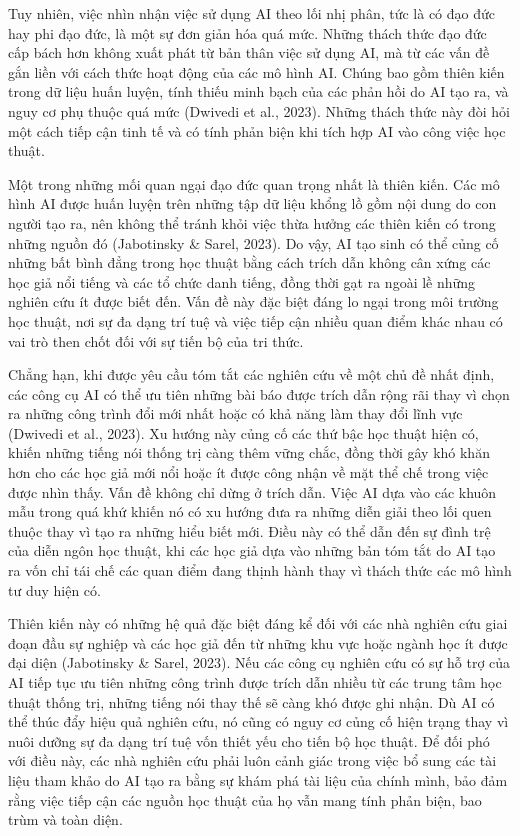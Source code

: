 Tuy nhiên, việc nhìn nhận việc sử dụng AI theo lối nhị phân, tức là có đạo đức hay phi đạo đức, là một sự đơn giản hóa quá mức. Những thách thức đạo đức cấp bách hơn không xuất phát từ bản thân việc sử dụng AI, mà từ các vấn đề gắn liền với cách thức hoạt động của các mô hình AI. Chúng bao gồm thiên kiến trong dữ liệu huấn luyện, tính thiếu minh bạch của các phản hồi do AI tạo ra, và nguy cơ phụ thuộc quá mức (Dwivedi et al., 2023). Những thách thức này đòi hỏi một cách tiếp cận tinh tế và có tính phản biện khi tích hợp AI vào công việc học thuật.

Một trong những mối quan ngại đạo đức quan trọng nhất là thiên kiến. Các mô hình AI được huấn luyện trên những tập dữ liệu khổng lồ gồm nội dung do con người tạo ra, nên không thể tránh khỏi việc thừa hưởng các thiên kiến có trong những nguồn đó (Jabotinsky \& Sarel, 2023). Do vậy, AI tạo sinh có thể củng cố những bất bình đẳng trong học thuật bằng cách trích dẫn không cân xứng các học giả nổi tiếng và các tổ chức danh tiếng, đồng thời gạt ra ngoài lề những nghiên cứu ít được biết đến. Vấn đề này đặc biệt đáng lo ngại trong môi trường học thuật, nơi sự đa dạng trí tuệ và việc tiếp cận nhiều quan điểm khác nhau có vai trò then chốt đối với sự tiến bộ của tri thức.

Chẳng hạn, khi được yêu cầu tóm tắt các nghiên cứu về một chủ đề nhất định, các công cụ AI có thể ưu tiên những bài báo được trích dẫn rộng rãi thay vì chọn ra những công trình đổi mới nhất hoặc có khả năng làm thay đổi lĩnh vực (Dwivedi et al., 2023). Xu hướng này củng cố các thứ bậc học thuật hiện có, khiến những tiếng nói thống trị càng thêm vững chắc, đồng thời gây khó khăn hơn cho các học giả mới nổi hoặc ít được công nhận về mặt thể chế trong việc được nhìn thấy. Vấn đề không chỉ dừng ở trích dẫn. Việc AI dựa vào các khuôn mẫu trong quá khứ khiến nó có xu hướng đưa ra những diễn giải theo lối quen thuộc thay vì tạo ra những hiểu biết mới. Điều này có thể dẫn đến sự đình trệ của diễn ngôn học thuật, khi các học giả dựa vào những bản tóm tắt do AI tạo ra vốn chỉ tái chế các quan điểm đang thịnh hành thay vì thách thức các mô hình tư duy hiện có.

Thiên kiến này có những hệ quả đặc biệt đáng kể đối với các nhà nghiên cứu giai đoạn đầu sự nghiệp và các học giả đến từ những khu vực hoặc ngành học ít được đại diện (Jabotinsky \& Sarel, 2023). Nếu các công cụ nghiên cứu có sự hỗ trợ của AI tiếp tục ưu tiên những công trình được trích dẫn nhiều từ các trung tâm học thuật thống trị, những tiếng nói thay thế sẽ càng khó được ghi nhận. Dù AI có thể thúc đẩy hiệu quả nghiên cứu, nó cũng có nguy cơ củng cố hiện trạng thay vì nuôi dưỡng sự đa dạng trí tuệ vốn thiết yếu cho tiến bộ học thuật. Để đối phó với điều này, các nhà nghiên cứu phải luôn cảnh giác trong việc bổ sung các tài liệu tham khảo do AI tạo ra bằng sự khám phá tài liệu của chính mình, bảo đảm rằng việc tiếp cận các nguồn học thuật của họ vẫn mang tính phản biện, bao trùm và toàn diện.


